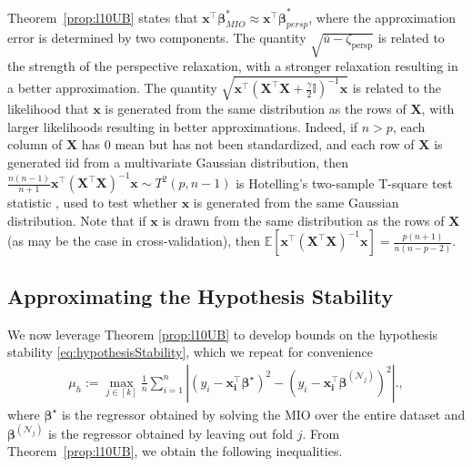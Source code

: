 \documentclass[mnsc,nonblindrev]{informs3} %
\newcommand{\ag}[1]{{\color{black}#1}}
\begin{document}
\begin{remark}[Intuition]\label{rem:intuition}
	Theorem~\ref{prop:l10UB} states that $\bm{x}^\top \bm{\beta}_{MIO}^*\approx\bm{x^\top\beta}_{persp}^*$, where the approximation error is determined by two components. The quantity $\sqrt{\bar u-\zeta_{\text{persp}}}$ is related to the strength of the perspective relaxation, with a stronger relaxation resulting in a better approximation. The quantity $\sqrt{\bm{x^\top}\left(\bm{X^\top X}+\frac{\gamma}{2}\mathbb{I}\right)^{-1}\bm{x}}$ is related to the likelihood that $\bm{x}$ is generated from the same distribution as the rows of $\bm{X}$, with larger likelihoods resulting in better approximations. Indeed, if $n>p$, each column of $\bm{X}$ has $0$ mean but has not been standardized, and each row of $\bm{X}$ is generated iid from a multivariate Gaussian distribution, then $\frac{n(n-1)}{n+1}\bm{x^\top}\left(\bm{X^\top X}\right)^{-1}\bm{x}\sim T^2(p, n-1)$ is Hotelling's two-sample T-square test statistic \citep{hotelling1931generalization}, used to test whether $\bm{x}$ is generated from the same Gaussian distribution. Note that if $\bm{x}$ is drawn from the same distribution as the rows of $\bm{X}$ (as may be the case in cross-validation), then $\mathbb{E}\left[\bm{x^\top}\left(\bm{X^\top X}\right)^{-1}\bm{x}\right]=\frac{p(n+1)}{n(n-p-2)}$.
\end{remark}

\iffalse
\subsection{Approximating the Hypothesis Stability} \label{ssec:genbounds2}

We now leverage Theorem \ref{prop:l10UB} to develop bounds on the hypothesis stability \eqref{eq:hypothesisStability}\ag{, which we repeat for convenience}
\begin{align*}
	\mu_h:=\max_{j\in [k]}\frac{1}{n}\sum_{i=1}^n \left\vert (y_i-\bm{x_i^\top\bm{\beta}^\star} )^2-(y_i-\bm{x_i^\top \beta}^{(\mathcal{N}_j)} )^2\right\vert.,
\end{align*}
\ag{where $\bm{\beta}^\star$ is the regressor obtained by solving the MIO over the entire dataset and $\bm{\beta}^{(\mathcal{N}_j)}$ is the regressor obtained by leaving out fold $j$. From Theorem~\ref{prop:l10UB}, we obtain the following inequalities.}
\end{document}
